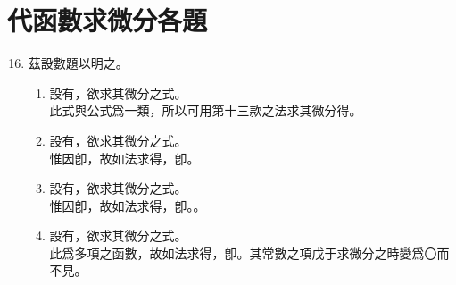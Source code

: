 \section{代函數求微分各題}

\begin{enumerate} [label={第\chinese*款}]
	\setcounter{enumi}{15}
	\item 茲設數題以明之。
	\begin{enumerate} [label={\chinese*題}]
	\item 設有\CJKmove，欲求其微分之式。\\
		  此式與公式\CJKmove 爲一類，所以可用第十三款之法求其微分得\CJKmove。
	\item 設有\CJKmove，欲求其微分之式。\\
	惟因\CJKmove 卽\CJKmove，故如法求得\CJKmove，卽\CJKmove。
	\item 設有\CJKmove，欲求其微分之式。\\
	惟因\CJKmove 卽\CJKmove，故如法求得\CJKmove，卽。\CJKmove。
	\item 設有\CJKmove，欲求其微分之式。\\
	此爲多項之函數，故如法求得\CJKmove，卽\CJKmove。其常數之項戊于求微分之時變爲〇而不見。

\end{enumerate}
\end{enumerate}
